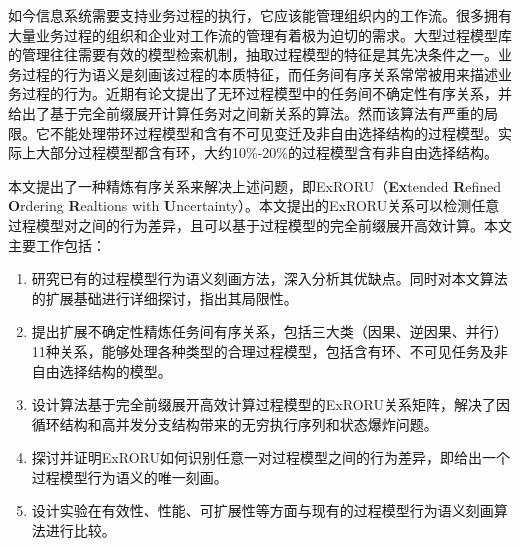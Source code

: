 \begin{cabstract}
如今信息系统需要支持业务过程的执行，它应该能管理组织内的工作流。很多拥有大量业务过程的组织和企业对工作流的管理有着极为迫切的需求。大型过程模型库的管理往往需要有效的模型检索机制，抽取过程模型的特征是其先决条件之一。业务过程的行为语义是刻画该过程的本质特征，而任务间有序关系常常被用来描述业务过程的行为。近期有论文提出了无环过程模型中的任务间不确定性有序关系，并给出了基于完全前缀展开计算任务对之间新关系的算法。然而该算法有严重的局限。它不能处理带环过程模型和含有不可见变迁及非自由选择结构的过程模型。实际上大部分过程模型都含有环，大约10\%-20\%的过程模型含有非自由选择结构。

本文提出了一种精炼有序关系来解决上述问题，即ExRORU（\textbf{Ex}tended \textbf{R}efined \textbf{O}rdering \textbf{R}ealtions with \textbf{U}ncertainty）。本文提出的ExRORU关系可以检测任意过程模型对之间的行为差异，且可以基于过程模型的完全前缀展开高效计算。本文主要工作包括：
\begin{enumerate}[1.]
  \item 研究已有的过程模型行为语义刻画方法，深入分析其优缺点。同时对本文算法的扩展基础进行详细探讨，指出其局限性。
  \item 提出扩展不确定性精炼任务间有序关系，包括三大类（因果、逆因果、并行）11种关系，能够处理各种类型的合理过程模型，包括含有环、不可见任务及非自由选择结构的模型。
  \item 设计算法基于完全前缀展开高效计算过程模型的ExRORU关系矩阵，解决了因循环结构和高并发分支结构带来的无穷执行序列和状态爆炸问题。
  \item 探讨并证明ExRORU如何识别任意一对过程模型之间的行为差异，即给出一个过程模型行为语义的唯一刻画。
  \item 设计实验在有效性、性能、可扩展性等方面与现有的过程模型行为语义刻画算法进行比较。
\end{enumerate}
\end{cabstract}


